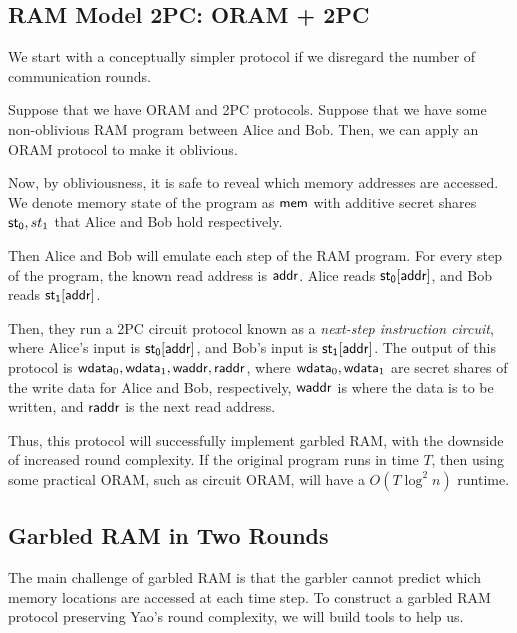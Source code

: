 \subsection{RAM Model 2PC: ORAM + 2PC}
We start with a conceptually simpler protocol if we disregard the number of communication rounds.

Suppose that we have ORAM and 2PC protocols. Suppose that we have some non-oblivious RAM program between Alice and Bob. Then, we can apply an ORAM protocol to make it oblivious.

Now, by obliviousness, it is safe to reveal which memory addresses are accessed. We denote memory state of the program as $\mathsf{mem}$ with additive secret shares $\mathsf{st_0},st_1$ that Alice and Bob hold respectively.

Then Alice and Bob will emulate each step of the RAM program.
For every step of the program, the known read address is $\mathsf{addr}$. Alice reads $\mathsf{st_0}[\mathsf{addr}]$, and Bob reads $\mathsf{st_1}[\mathsf{addr}]$.

Then, they run a 2PC circuit protocol known as a \textit{next-step instruction circuit}, where Alice's input is $\mathsf{st_0}[\mathsf{addr}]$, and Bob's input is $\mathsf{st_1}[\mathsf{addr}]$. 
The output of this protocol is $\mathsf{wdata}_0, \mathsf{wdata}_1,\mathsf{waddr},\mathsf{raddr}$, where $\mathsf{wdata}_0, \mathsf{wdata}_1$ are secret shares of the write data for Alice and Bob, respectively, $\mathsf{waddr}$ is where the data is to be written, and $\mathsf{raddr}$ is the next read address.

Thus, this protocol will successfully implement garbled RAM, with the downside of increased round complexity. If the original program runs in time $T$, then using some practical ORAM, such as circuit ORAM, will have a $O(T\log^2 n)$ runtime.


\subsection{Garbled RAM in Two Rounds}
The main challenge of garbled RAM is that the garbler cannot predict which memory locations are accessed at each time step.
To construct a garbled RAM protocol preserving Yao's round complexity, we will build tools to help us.
